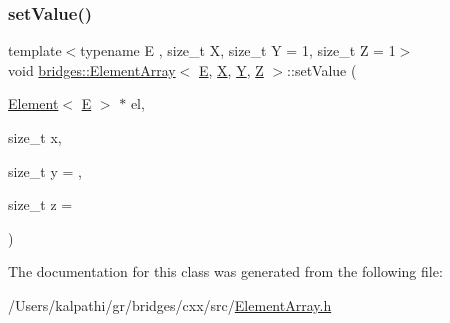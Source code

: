 \subsubsection{\texorpdfstring{setValue()}{setValue()}}
{\footnotesize\ttfamily template$<$typename E , size\+\_\+t X, size\+\_\+t Y = 1, size\+\_\+t Z = 1$>$ \\
void \mbox{\hyperlink{classbridges_1_1_element_array}{bridges\+::\+Element\+Array}}$<$ \mbox{\hyperlink{namespacebridges_acfb0a4f7877d8f63de3e6862004c50eda3a3ea00cfc35332cedf6e5e9a32e94da}{E}}, \mbox{\hyperlink{namespacebridges_acfb0a4f7877d8f63de3e6862004c50eda02129bb861061d1a052c592e2dc6b383}{X}}, \mbox{\hyperlink{namespacebridges_acfb0a4f7877d8f63de3e6862004c50eda57cec4137b614c87cb4e24a3d003a3e0}{Y}}, \mbox{\hyperlink{namespacebridges_acfb0a4f7877d8f63de3e6862004c50eda21c2e59531c8710156d34a3c30ac81d5}{Z}} $>$\+::set\+Value (\begin{DoxyParamCaption}\item[{\mbox{\hyperlink{classbridges_1_1_element}{Element}}$<$ \mbox{\hyperlink{namespacebridges_acfb0a4f7877d8f63de3e6862004c50eda3a3ea00cfc35332cedf6e5e9a32e94da}{E}} $>$ $\ast$}]{el,  }\item[{size\+\_\+t}]{x,  }\item[{size\+\_\+t}]{y = {},  }\item[{size\+\_\+t}]{z = {} }\end{DoxyParamCaption})\hspace{0.3cm}{\ttfamily [inline]}}



The documentation for this class was generated from the following file\+:\begin{DoxyCompactItemize}
\item 
/\+Users/kalpathi/gr/bridges/cxx/src/\mbox{\hyperlink{_element_array_8h}{Element\+Array.\+h}}\end{DoxyCompactItemize}
